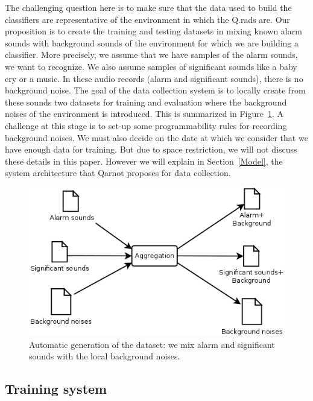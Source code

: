 \documentclass[10pt, conference, compsocconf]{IEEEtran}
\begin{document}
The challenging question here is to make sure that the data used to build the classifiers are representative of the environment 
in which the Q.rads are. Our proposition is to create the training and testing datasets in mixing known alarm sounds with 
background sounds of the environment for which we are building a classifier. More precisely, we assume that we have 
samples of the alarm sounds, we want to recognize. We also assume samples of significant sounds like a baby cry or a music. 
In these audio records (alarm and significant sounds), there is no background noise. The goal of the data collection 
system is to locally create from these sounds two datasets for training and evaluation where 
the background noises of the environment is introduced. This is summarized in Figure~\ref{fig:gen}. 
A challenge at this stage is to set-up some programmability rules for recording background noises. We must also decide on the date at which we consider that we have enough data for training. But due to space restriction, we will not discuss these details in this paper. However we will explain in Section~\ref{Model}, the 
system architecture that Qarnot proposes for data collection.

	\begin{figure}[hbtp]
	\begin{center}
	\includegraphics[scale=0.3]{./Figures/Aggregation.png}
	\caption{Automatic generation of the dataset: we mix alarm and significant sounds with the local background noises.}
	\label{fig:gen}
	\end{center}
	\end{figure}


\subsection{Training system}
\end{document}
